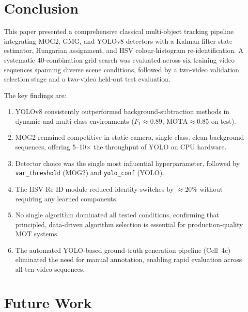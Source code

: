 \documentclass[10pt, conference, compsocconf]{IEEEtran}
\begin{document}
\section{Conclusion}

This paper presented a comprehensive classical multi-object tracking
pipeline integrating MOG2, GMG, and YOLOv8 detectors with a
Kalman-filter state estimator, Hungarian assignment, and HSV
colour-histogram re-identification. A systematic 40-combination grid
search was evaluated across six training video sequences spanning
diverse scene conditions, followed by a two-video validation
selection stage and a two-video held-out test evaluation.

The key findings are:
\begin{enumerate}
  \item YOLOv8 consistently outperformed background-subtraction
        methods in dynamic and multi-class environments
        ($F_1 \approx 0.89$, $\text{MOTA} \approx 0.85$ on test).
  \item MOG2 remained competitive in static-camera, single-class,
        clean-background sequences, offering 5--10$\times$ the
        throughput of YOLO on CPU hardware.
  \item Detector choice was the single most influential hyperparameter,
        followed by \texttt{var\_threshold} (MOG2) and
        \texttt{yolo\_conf} (YOLO).
  \item The HSV Re-ID module reduced identity switches by
        $\approx$20\% without requiring any learned components.
  \item No single algorithm dominated all tested conditions,
        confirming that principled, data-driven algorithm selection
        is essential for production-quality MOT systems.
  \item The automated YOLO-based ground-truth generation pipeline
        (Cell~4c) eliminated the need for manual annotation, enabling
        rapid evaluation across all ten video sequences.
\end{enumerate}

\section{Future Work}
\end{document}
